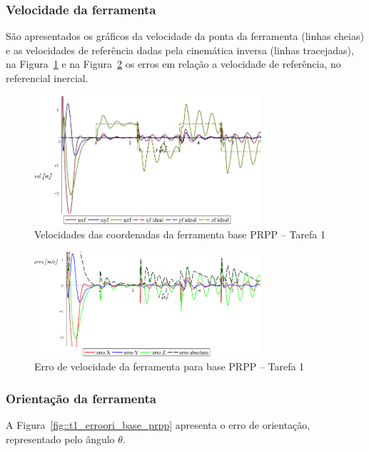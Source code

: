 \subsubsection{Velocidade da ferramenta}

São apresentados os gráficos da velocidade da ponta da ferramenta (linhas
cheias) e as velocidades de referência dadas pela cinemática inversa (linhas
tracejadas), na Figura~\ref{fig::t1_velf_base_prpp} e na
Figura~\ref{fig::t1_errovelf_base_prpp} os erros em relação a velocidade de
referência, no referencial inercial.

\begin{figure}[h!]
	\centering 
 	\includegraphics[width=0.75\textwidth]{figs/t1_velf_base_prpp}
 	\caption{Velocidades das coordenadas da ferramenta base PRPP --
 	Tarefa 1}
 	\label{fig::t1_velf_base_prpp}
\end{figure}

\begin{figure}[h!]
	\centering 
 	\includegraphics[width=0.75\textwidth]{figs/t1_errovelf_base_prpp}
 	\caption{Erro de velocidade da ferramenta para base PRPP --
 	Tarefa 1}
 	\label{fig::t1_errovelf_base_prpp}
\end{figure}

\subsubsection{Orientação da ferramenta}

A Figura~\ref{fig::t1_erroori_base_prpp} apresenta o erro de orientação,
representado pelo ângulo $\theta$.


